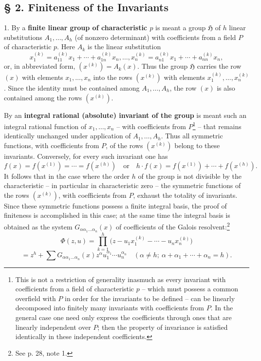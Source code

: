 \documentclass[11pt]{article}
\begin{document}
\subsection*{§ 2. Finiteness of the Invariants}

1. By a \textbf{finite linear group of characteristic $p$} is meant a group $\mathfrak H$ of $h$ linear substitutions $A_1,\ldots,A_h$ (of nonzero determinant) with coefficients from a field $P$ of characteristic $p$. Here $A_k$ is the linear substitution
\[
 x_1^{(k)}=a_{11}^{(k)}x_1+\cdots+a_{1n}^{(k)}x_n,
 \ldots,
 x_n^{(k)}=a_{n1}^{(k)}x_1+\cdots+a_{nn}^{(k)}x_n,
\]
or, in abbreviated form, $(x^{(k)})=A_k(x)$. Thus the group $\mathfrak H$ carries the row $(x)$ with elements $x_1,
\ldots,x_n$ into the rows $(x^{(k)})$ with elements $x_1^{(k)},
\ldots,x_n^{(k)}$. Since the identity must be contained among $A_1,
\ldots,A_h$, the row $(x)$ is also contained among the rows $(x^{(k)})$.

By an \textbf{integral rational (absolute) invariant of the group} is meant such an integral rational function of $x_1,
\ldots,x_n$ -- with coefficients from $P$\footnote{This is not a restriction of generality inasmuch as every invariant with coefficients from a field of characteristic $p$ -- which must possess a common overfield with $P$ in order for the invariants to be defined -- can be linearly decomposed into finitely many invariants with coefficients from $P$. In the general case one need only express the coefficients through ones that are linearly independent over $P$; then the property of invariance is satisfied identically in these independent coefficients.} -- that remains identically unchanged under application of $A_1,
\ldots,A_h$. Thus all symmetric functions, with coefficients from $P$, of the rows $(x^{(k)})$ belong to these invariants. Conversely, for every such invariant one has
\[
 f(x)=f(x^{(1)})=\cdots=f(x^{(h)})
 \quad\text{or}\quad
 h\cdot f(x)=f(x^{(1)})+\cdots+f(x^{(h)}).
\]
It follows that in the case where the order $h$ of the group is not divisible by the characteristic -- in particular in characteristic zero -- the symmetric functions of the rows $(x^{(k)})$, with coefficients from $P$, exhaust the totality of invariants. Since these symmetric functions possess a finite integral basis, the proof of finiteness is accomplished in this case; at the same time the integral basis is obtained as the system $G_{\alpha\alpha_1\ldots\alpha_n}(x)$ of coefficients of the Galois resolvent:\footnote{See p. 28, note 1.}
\[
 \Phi(z,u)=\prod_{k=1}^{h}\bigl(z-u_1x_1^{(k)}-\cdots-u_nx_n^{(k)}\bigr)
\]
\[
 =z^h+\sum G_{\alpha\alpha_1\ldots\alpha_n}(x)
 z^{\alpha}u_1^{\alpha_1}\cdots u_n^{\alpha_n}
 \quad(\alpha\ne h;\ \alpha+\alpha_1+\cdots+\alpha_n=h).
\]
\end{document}
